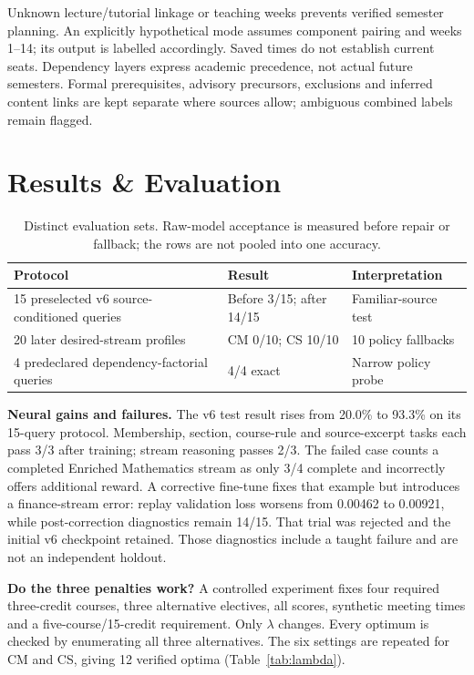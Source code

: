\documentclass{article}
\begin{document}
Unknown lecture/tutorial linkage or teaching weeks prevents verified semester planning. An explicitly hypothetical mode assumes component pairing and weeks 1--14; its output is labelled accordingly. Saved times do not establish current seats. Dependency layers express academic precedence, not actual future semesters. Formal prerequisites, advisory precursors, exclusions and inferred content links are kept separate where sources allow; ambiguous combined labels remain flagged.

\section{Results \& Evaluation}
\begin{table}[H]
\centering\small
\caption{Distinct evaluation sets. Raw-model acceptance is measured before repair or fallback; the rows are not pooled into one accuracy.}
\begin{tabular}{p{2.55in}p{1.2in}p{1.25in}}
\toprule
Protocol & Result & Interpretation\\
\midrule
15 preselected v6 source-conditioned queries & Before 3/15; after 14/15 & Familiar-source test\\
20 later desired-stream profiles & CM 0/10; CS 10/10 & 10 policy fallbacks\\
4 predeclared dependency-factorial queries & 4/4 exact & Narrow policy probe\\
\bottomrule
\end{tabular}
\label{tab:main}
\end{table}

\newpage
\textbf{Neural gains and failures.} The v6 test result rises from 20.0\% to 93.3\% on its 15-query protocol. Membership, section, course-rule and source-excerpt tasks each pass 3/3 after training; stream reasoning passes 2/3. The failed case counts a completed Enriched Mathematics stream as only 3/4 complete and incorrectly offers additional reward. A corrective fine-tune fixes that example but introduces a finance-stream error: replay validation loss worsens from 0.00462 to 0.00921, while post-correction diagnostics remain 14/15. That trial was rejected and the initial v6 checkpoint retained. Those diagnostics include a taught failure and are not an independent holdout.

\textbf{Do the three penalties work?} A controlled experiment fixes four required three-credit courses, three alternative electives, all scores, synthetic meeting times and a five-course/15-credit requirement. Only $\lambda$ changes. Every optimum is checked by enumerating all three alternatives. The six settings are repeated for CM and CS, giving 12 verified optima (Table~\ref{tab:lambda}).
\end{document}
